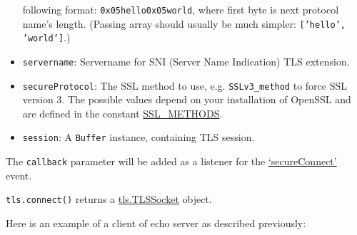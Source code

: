 \begin{itemize}
  following format: \texttt{0x05hello0x05world}, where first byte is
  next protocol name's length. (Passing array should usually be much
  simpler: \texttt{{[}'hello', 'world'{]}}.)
\item
  \texttt{servername}: Servername for SNI (Server Name Indication) TLS
  extension.
\item
  \texttt{secureProtocol}: The SSL method to use, e.g.
  \texttt{SSLv3\_method} to force SSL version 3. The possible values
  depend on your installation of OpenSSL and are defined in the constant
  \href{http://www.openssl.org/docs/ssl/ssl.html\#DEALING_WITH_PROTOCOL_METHODS}{SSL\_METHODS}.
\item
  \texttt{session}: A \texttt{Buffer} instance, containing TLS session.
\end{itemize}

The \texttt{callback} parameter will be added as a listener for the
\hyperref[tlsux5feventux5fsecureconnect]{`secureConnect'} event.

\texttt{tls.connect()} returns a
\hyperref[tlsux5fclassux5ftlsux5ftlssocket]{tls.TLSSocket} object.

Here is an example of a client of echo server as described previously:

